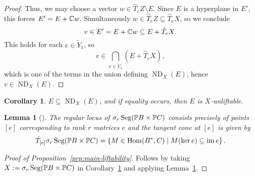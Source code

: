 \documentclass[a4paper,10pt]{article}
\def\reg{\text{reg}}
\def\set#1{\left\{#1\right\}}
\DeclareMathOperator{\Hom}{Hom}\let\hom\Hom
\DeclareMathOperator{\im}{im}
\DeclareMathOperator{\ND}{ND}
\DeclareMathOperator{\Seg}{Seg}
\newtheorem{lemma}[theorem]{Lemma}
\newtheorem{corollary}[theorem]{Corollary}
\theoremstyle{definition}
\theoremstyle{remark}
\begin{document}
\begin{proof}
    Thus, we may choose a vector $w\in \hat T_e Z\setminus E$. Since $E$ is a hyperplane in $E'$, this forces $E' = E+\ce w$. Simultaneously $w\in\hat T_e Z \subseteq \hat T_e X$, so we conclude
    \[
        v \in E' = E+\ce w \subseteq E+\hat T_e X.
    \]
    This holds for each $e\in \tilde Y_1$, so
    \[
        v \in \bigcap_{e\in \tilde Y_1}(E+\hat T_e X),
    \]
    which is one of the terms in the union defining $\ND_X(E)$, hence $v\in \ND_X(E)$.
%
\end{proof}


\begin{corollary}
    \label{cor:criterion}
    $E\subseteq \ND_X(E)$, and if equality occurs, then $E$ is $X$-unliftable.
\end{corollary}



\begin{lemma}[{\cite[Lemma 9.]{draisma}}]
    \label{lem:secant-segre-tangent}
    The regular locus of $\sigma_r\Seg(\pe B\times\pe C)$ consists precisely of points $[e]$ corresponding to rank $r$ matrices $e$ and the tangent cone at $[e]$ is given by \[\hat T_{[e]}\sigma_r\Seg(\pe B\times\pe C) = \set{M\in \Hom(B^*, C)\mid M(\ker e)\subseteq \im e}.\]
\end{lemma}

\begin{proof}[Proof of Proposition~\ref{prp:main-liftability}]
    Follows by taking $X:= \sigma_r \Seg(\pe B\times\pe C)$ in Corollary~\ref{cor:criterion} and applying Lemma~\ref{lem:secant-segre-tangent}.
\end{proof}
\end{document}
